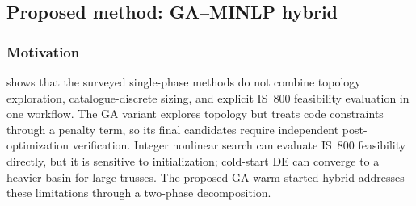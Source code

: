 \documentclass[lineno,pdflatex,sn-mathphys-num]{sn-jnl}
\begin{document}
\subsection{Proposed method: GA--MINLP hybrid}
\label{sec:gaminlp}

\subsubsection{Motivation}

 shows that the surveyed single-phase methods do not
combine topology exploration, catalogue-discrete sizing, and explicit
IS~800 feasibility evaluation in one workflow. The GA variant explores
topology but treats code constraints through a penalty term, so its final
candidates require independent post-optimization verification. Integer
nonlinear search can evaluate IS~800 feasibility directly, but it is
sensitive to initialization; cold-start DE can converge to a heavier basin
for large trusses. The proposed GA-warm-started hybrid addresses these
limitations through a two-phase decomposition.
\end{document}
